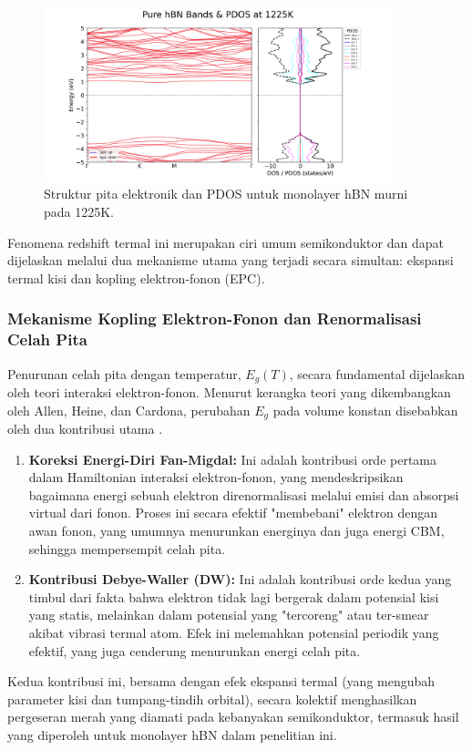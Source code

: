 \begin{figure}[h!]
    \centering
    \includegraphics[width=0.9\textwidth]{gambar_hasil/simple_bands_pdos_pure_1225K.png}
    \caption{Struktur pita elektronik dan PDOS untuk monolayer hBN murni pada 1225K.}
    \label{fig:hbn_pure_1225K}
\end{figure}

Fenomena redshift termal ini merupakan ciri umum semikonduktor dan dapat dijelaskan melalui dua mekanisme utama yang terjadi secara simultan: ekspansi termal kisi dan kopling elektron-fonon (EPC).

\subsubsection{Mekanisme Kopling Elektron-Fonon dan Renormalisasi Celah Pita}
Penurunan celah pita dengan temperatur, $E_g(T)$, secara fundamental dijelaskan oleh teori interaksi elektron-fonon. Menurut kerangka teori yang dikembangkan oleh Allen, Heine, dan Cardona, perubahan $E_g$ pada volume konstan disebabkan oleh dua kontribusi utama \citep{Allen1983}.
\begin{enumerate}
    \item \textbf{Koreksi Energi-Diri Fan-Migdal:} Ini adalah kontribusi orde pertama dalam Hamiltonian interaksi elektron-fonon, yang mendeskripsikan bagaimana energi sebuah elektron direnormalisasi melalui emisi dan absorpsi virtual dari fonon. Proses ini secara efektif "membebani" elektron dengan awan fonon, yang umumnya menurunkan energinya dan juga energi CBM, sehingga mempersempit celah pita.
    \item \textbf{Kontribusi Debye-Waller (DW):} Ini adalah kontribusi orde kedua yang timbul dari fakta bahwa elektron tidak lagi bergerak dalam potensial kisi yang statis, melainkan dalam potensial yang "tercoreng" atau ter-smear akibat vibrasi termal atom. Efek ini melemahkan potensial periodik yang efektif, yang juga cenderung menurunkan energi celah pita.
\end{enumerate}
Kedua kontribusi ini, bersama dengan efek ekspansi termal (yang mengubah parameter kisi dan tumpang-tindih orbital), secara kolektif menghasilkan pergeseran merah yang diamati pada kebanyakan semikonduktor, termasuk hasil yang diperoleh untuk monolayer hBN dalam penelitian ini.

